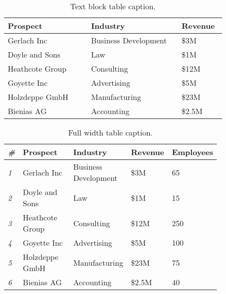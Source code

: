 \documentclass[
	letterpaper, %
	12pt, %
]{CSSullivanBusinessReport}
\begin{document}
\begin{table}[H] %
	\caption{Text block table caption.}
	\begin{tabular}{L{0.35\linewidth} L{0.38\linewidth} L{0.16\linewidth}}
		\toprule
		\textbf{Prospect} & \textbf{Industry} & \textbf{Revenue} \\
		\midrule
		Gerlach Inc & Business Development & \$3M\\
		Doyle and Sons & Law & \$1M\\
		Heathcote Group & Consulting & \$12M\\
		Goyette Inc & Advertising & \$5M\\
		Holzdeppe GmbH & Manufacturing & \$23M\\
		Bienias AG & Accounting & \$2.5M\\
		\bottomrule
	\end{tabular}
	\label{tab:example}
\end{table}


\begin{table*} %
	\caption{Full width table caption.}
	\begin{tabular}{C{0.03\linewidth} L{0.25\linewidth} L{0.27\linewidth} L{0.16\linewidth} L{0.16\linewidth}}
		\toprule
		\textit{\#} & \textbf{Prospect} & \textbf{Industry} & \textbf{Revenue} & \textbf{Employees} \\
		\midrule
		\textit{1} & Gerlach Inc & Business Development & \$3M & 65\\
		\textit{2} & Doyle and Sons & Law & \$1M & 15\\
		\textit{3} & Heathcote Group & Consulting & \$12M & 250\\
		\textit{4} & Goyette Inc & Advertising & \$5M & 100\\
		\textit{5} & Holzdeppe GmbH & Manufacturing & \$23M & 75\\
		\textit{6} & Bienias AG & Accounting & \$2.5M & 40\\
		\bottomrule
	\end{tabular}
\end{table*}

\end{document}
